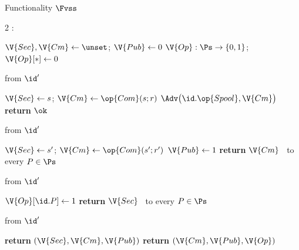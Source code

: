 \begin{interface}[nofloat]{Functionality $\Fvss$ \\
}

{\scriptsize
\setlength{\columnsep}{1.4em}
\begin{multicols}{2}
:
\begin{algorithmic}[1]
\setcounter{contline}{0}\algcont
\State $\V{Sec}, \V{Cm} \gets \unset$; \quad $\V{Pub} \gets 0$
\State $\V{Op} : \Ps \to \{0,1\}$; \quad $\V{Op}[*] \gets 0$
\algsave
\end{algorithmic}
\vspace{1.4ex}

 \quad from $\id'$
\begin{algorithmic}[1]
\algcont
{} \label{ln:vssdealer}
\State $\V{Sec} \gets s$; \quad $\V{Cm} \gets \op{Com}(s; r)$
\State $\Adv\bigl(\id.\op{Spool}, \V{Cm}\bigr)$ \label{ln:vssspool}
\State \textbf{return} $\ok$
\algsave
\end{algorithmic}
\vspace{1.4ex}

\columnbreak

 \quad from $\id'$
\begin{algorithmic}[1]
\algcont
{}
 \label{ln:vsschange}
  \State $\V{Sec} \gets s'$; \quad $\V{Cm} \gets \op{Com}(s'; r')$
\EndIf
\State $\V{Pub} \gets 1$
\State \textbf{return} $\V{Cm}$ \ to every $P \in \Ps$
\algsave
\end{algorithmic}
\vspace{1.4ex}

 \quad from $\id'$
\begin{algorithmic}[1]
\algcont
{}
\State $\V{Op}[\id.P] \gets 1$
 \label{ln:vssthresh}
\State \textbf{return} $\V{Sec}$ \ to every $P \in \Ps$ \label{ln:vssopen}
\algsave
\end{algorithmic}
\vspace{1.4ex}

 \quad from $\id'$
\begin{algorithmic}[1]
\algcont
{}
  \State \textbf{return} $(\V{Sec}, \V{Cm}, \V{Pub})$ \label{ln:vssleakd}
\EndIf
\State \textbf{return} $(\V{Cm}, \V{Pub}, \V{Op})$ \label{ln:vssleak}
\algsave
\end{algorithmic}
\end{multicols}}
\end{interface}
